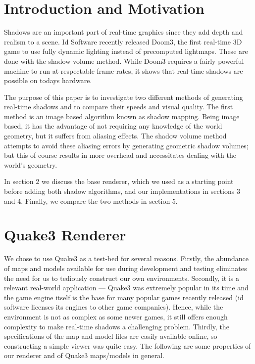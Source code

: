 \documentclass{llncs}
\begin{document}
\begin{multicols}{2}{
\section{Introduction and Motivation} Shadows are an important
part of real-time graphics since they add depth and realism to a scene.  
Id Software recently released Doom3, the first 
real-time 3D game to use fully dynamic lighting instead of precomputed lightmaps.
These are done with the shadow volume method.  While Doom3 requires a fairly powerful machine 
to run at respectable frame-rates, it shows that real-time shadows are possible
on todays hardware.  
 
The purpose of this paper is to investigate two different methods of generating
real-time shadows and to compare their speeds and visual quality.  The first
method is an image based algorithm known as shadow mapping.  Being image based, 
it has the advantage of not requiring any knowledge of the world geometry, but it suffers from
aliasing effects.  The shadow volume method attempts to avoid these 
aliasing errors by generating geometric shadow volumes; but this of course results in more 
overhead and necessitates dealing with the world's geometry. 

In section 2 we discuss the base renderer, which we used as a starting point
before adding both shadow algorithms, and our implementations in sections 3 and 4. 
Finally, we compare the two methods in section 5. 

\section{Quake3 Renderer}
We chose to use Quake3 as a test-bed for several reasons.  Firstly, 
the abundance of maps and models available for use during development and testing 
eliminates the need for us to tediously construct our own environments.
Secondly, it is a relevant real-world application --- Quake3 was 
extremely popular in its time and the game engine itself is the base 
for many popular games recently released (id software licenses its engines to 
other game companies). Hence, while the environment is not as complex as some newer games, 
it still offers enough complexity to make real-time shadows a challenging problem.  Thirdly, 
the specifications of the map and model files are easily available online, so constructing 
a simple viewer was quite easy. The following are some properties of our renderer and of 
Quake3 maps/models in general.

}
\end{multicols}
\end{document}
